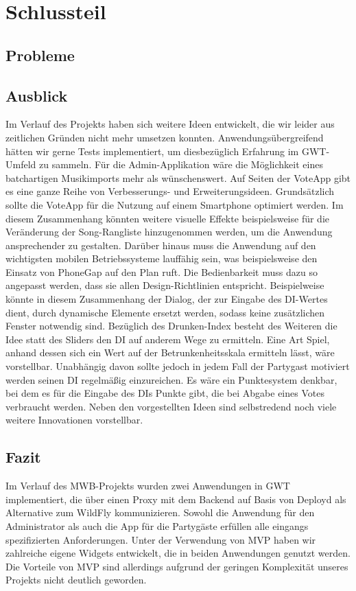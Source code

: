 \section{Schlussteil}
\subsection{Probleme}

\subsection{Ausblick}
Im Verlauf des Projekts haben sich weitere Ideen entwickelt, die wir leider aus zeitlichen Gründen nicht mehr umsetzen konnten. Anwendungsübergreifend hätten wir gerne Tests implementiert, um diesbezüglich Erfahrung im GWT-Umfeld zu sammeln. Für die Admin-Applikation wäre die Möglichkeit eines batchartigen Musikimports mehr als wünschenswert. Auf Seiten der VoteApp gibt es eine ganze Reihe von Verbesserungs- und Erweiterungsideen. Grundsätzlich sollte die VoteApp für die Nutzung auf einem Smartphone optimiert werden. Im diesem Zusammenhang könnten weitere visuelle Effekte beispielsweise für die Veränderung der Song-Rangliste hinzugenommen werden, um die Anwendung ansprechender zu gestalten. Darüber hinaus muss die Anwendung auf den wichtigsten mobilen Betriebssysteme lauffähig sein, was beispielsweise den Einsatz von PhoneGap auf den Plan ruft. Die Bedienbarkeit muss dazu so angepasst werden, dass sie allen Design-Richtlinien entspricht. Beispielweise könnte in diesem Zusammenhang der Dialog, der zur Eingabe des DI-Wertes dient, durch dynamische Elemente ersetzt werden, sodass keine zusätzlichen Fenster notwendig sind. Bezüglich des Drunken-Index besteht des Weiteren die Idee statt des Sliders den DI auf anderem Wege zu ermitteln. Eine Art Spiel, anhand dessen sich ein Wert auf der Betrunkenheitsskala ermitteln lässt, wäre vorstellbar. Unabhängig davon sollte jedoch in jedem Fall der Partygast motiviert werden seinen DI regelmäßig einzureichen. Es wäre ein Punktesystem denkbar, bei dem es für die Eingabe des DIs Punkte gibt, die bei Abgabe eines Votes verbraucht werden. Neben den vorgestellten Ideen sind selbstredend noch viele weitere Innovationen vorstellbar.

\subsection{Fazit}
Im Verlauf des MWB-Projekts wurden zwei Anwendungen in GWT implementiert, die über einen Proxy mit dem Backend auf Basis von Deployd als Alternative zum WildFly kommunizieren. Sowohl die Anwendung für den Administrator als auch die App für die Partygäste erfüllen alle eingangs spezifizierten Anforderungen. Unter der Verwendung von MVP haben wir zahlreiche eigene Widgets entwickelt, die in beiden Anwendungen genutzt werden. Die Vorteile von MVP sind allerdings aufgrund der geringen Komplexität unseres Projekts nicht deutlich geworden. 

